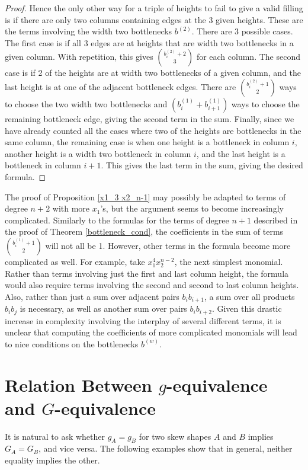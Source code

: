 \documentclass[12pt]{amsart}
\theoremstyle{definition}
\begin{document}
\begin{proof}
Hence the only other way for a triple of heights to fail to give a valid filling is if there are only two columns containing edges at the 3 given heights. These are the terms involving the width two bottlenecks $b^{(2)}$. There are 3 possible cases. The first case is if all 3 edges are at heights that are width two bottlenecks in a given column. With repetition, this gives $\binom{b_i^{(2)}+2}{3}$ for each column. The second case is if 2 of the heights are at width two bottlenecks of a given column, and the last height is at one of the adjacent bottleneck edges. There are $\binom{b_i^{(2)}+1}{2}$ ways to choose the two width two bottlenecks and $(b_i^{(1)}+b_{i+1}^{(1)})$ ways to choose the remaining bottleneck edge, giving the second term in the sum. Finally, since we have already counted all the cases where two of the heights are bottlenecks in the same column, the remaining case is when one height is a bottleneck in column $i$, another height is a width two bottleneck in column $i$, and the last height is a bottleneck in column $i+1$. This gives the last term in the sum, giving the desired formula.
\end{proof}

The proof of Proposition \ref{x1_3 x2_n-1} may possibly be adapted to terms of degree $n+2$ with more $x_1$'s, but the argument seems to become increasingly complicated. Similarly to the formulas for the terms of degree $n+1$ described in the proof of Theorem \ref{bottleneck_cond}, the coefficients in the sum of terms $\binom{b^{(1)}_i+1}{2}$ will not all be 1. However, other terms in the formula become more complicated as well. For example, take $x_1^4 x_2^{n-2}$, the next simplest monomial. Rather than terms involving just the first and last column height, the formula would also require terms involving the second and second to last column heights. Also, rather than just a sum over adjacent pairs $b_i b_{i+1}$, a sum over all products $b_i b_j$ is necessary, as well as another sum over pairs $b_i b_{i+2}$. Given this drastic increase in complexity involving the interplay of several different terms, it is unclear that computing the coefficients of more complicated monomials will lead to nice conditions on the bottlenecks $b^{(w)}$.
\fi

\section{Relation Between $g$-equivalence and $G$-equivalence}

It is natural to ask whether $g_A = g_B$ for two skew shapes $A$ and $B$ implies $G_A = G_B$, and vice versa. The following examples show that in general, neither equality implies the other.
\end{document}
